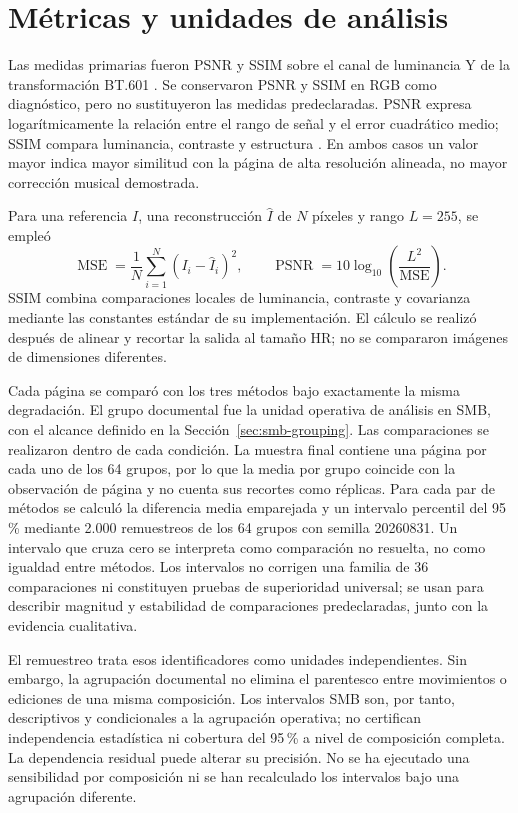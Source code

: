 \section{Métricas y unidades de análisis}
Las medidas primarias fueron PSNR y SSIM sobre el canal de luminancia Y de la transformación
BT.601 \cite{ituBt601}. Se conservaron PSNR y SSIM en RGB como diagnóstico, pero no sustituyeron las medidas
predeclaradas. PSNR expresa logarítmicamente la relación entre el rango de señal y el error
cuadrático medio; SSIM compara luminancia, contraste y estructura \cite{wang2004ssim}. En ambos
casos un valor mayor indica mayor similitud con la página de alta resolución alineada, no mayor
corrección musical demostrada.

Para una referencia \(I\), una reconstrucción \(\hat I\) de \(N\) píxeles y rango \(L=255\), se
empleó
\[
  \operatorname{MSE}=\frac{1}{N}\sum_{i=1}^{N}(I_i-\hat I_i)^2,
  \qquad
  \operatorname{PSNR}=10\log_{10}\!\left(\frac{L^2}{\operatorname{MSE}}\right).
\]
SSIM combina comparaciones locales de luminancia, contraste y covarianza mediante las constantes
estándar de su implementación. El cálculo se realizó después de alinear y recortar la salida al
tamaño HR; no se compararon imágenes de dimensiones diferentes.

Cada página se comparó con los tres métodos bajo exactamente la misma degradación. El grupo
documental fue la unidad operativa de análisis en SMB, con el alcance definido en la
Sección~\ref{sec:smb-grouping}. Las comparaciones se realizaron dentro de cada condición. La muestra
final contiene una página por cada uno de los 64 grupos, por lo que la media por grupo coincide
con la observación de página y no cuenta sus recortes como réplicas. Para cada par de métodos se calculó
la diferencia media emparejada y un intervalo percentil del 95\,\% mediante 2.000 remuestreos de
los 64 grupos con semilla 20260831. Un intervalo que cruza cero se interpreta como comparación no
resuelta, no como igualdad entre métodos. Los intervalos no corrigen una familia de 36
comparaciones ni constituyen pruebas de superioridad universal; se usan para describir magnitud y
estabilidad de comparaciones predeclaradas, junto con la evidencia cualitativa.

El remuestreo trata esos identificadores como unidades independientes. Sin embargo, la agrupación
documental no elimina el parentesco entre movimientos o ediciones de una misma composición.
Los intervalos SMB son, por tanto, descriptivos y condicionales a la agrupación operativa; no
certifican independencia estadística ni cobertura del 95\,\% a nivel de composición completa.
La dependencia residual puede alterar su precisión. No se ha ejecutado una sensibilidad por
composición ni se han recalculado los intervalos bajo una agrupación diferente.

